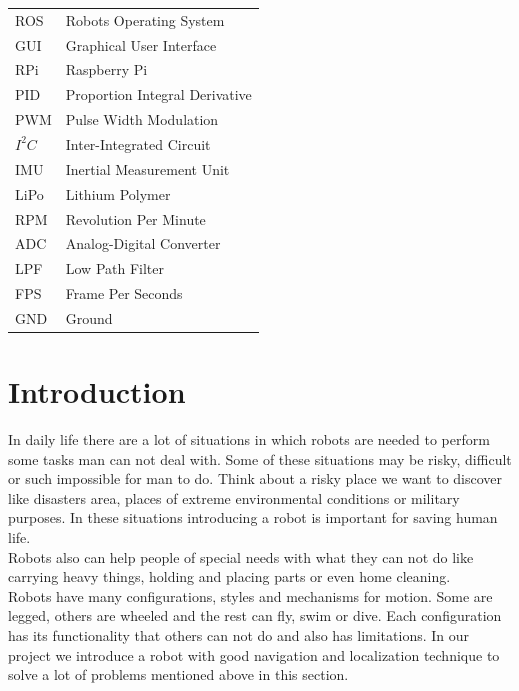 \documentclass[12pt]{article}
\begin{document}
 \begin{tabular}{  l    l   }
    ROS & Robots Operating System	\\
    GUI & Graphical User Interface	\\
    RPi &   Raspberry Pi	\\
    
    PID & Proportion Integral Derivative  \\  
    PWM &  Pulse Width Modulation  \\   
    $I^2C$  & Inter-Integrated Circuit   \\  
    IMU &  Inertial Measurement Unit \\  
    LiPo &   Lithium Polymer\\ 
    RPM   & Revolution Per Minute  \\
    ADC   & Analog-Digital Converter   \\  
    LPF & Low Path Filter \\
    FPS & Frame Per Seconds\\
    GND & Ground
    
  \end{tabular} 

\newpage
\renewcommand{\headrulewidth}{.5pt}


\tableofcontents
\newpage
\listoffigures
\thispagestyle{empty}
\newpage
{}
\setcounter{page}{1}


\section{Introduction}
 In daily life there are a lot of situations in which robots are needed to perform some tasks man can not deal with. Some of these situations may be risky, difficult or such impossible for man to do. Think about a risky place we want to discover like disasters area, places of extreme environmental conditions or military purposes. In these situations introducing a robot is important for saving human life.\\
 Robots also can help people of special needs with what they can not do like carrying heavy things, holding and placing parts or even home cleaning.\\
 Robots have many configurations, styles and mechanisms for motion. Some are legged, others are wheeled and the rest can fly, swim or dive. Each configuration has its functionality that others can not do and also has limitations.
 In our project we introduce a robot with good navigation and localization technique to solve a lot of problems mentioned above in this section. 
\end{document}
